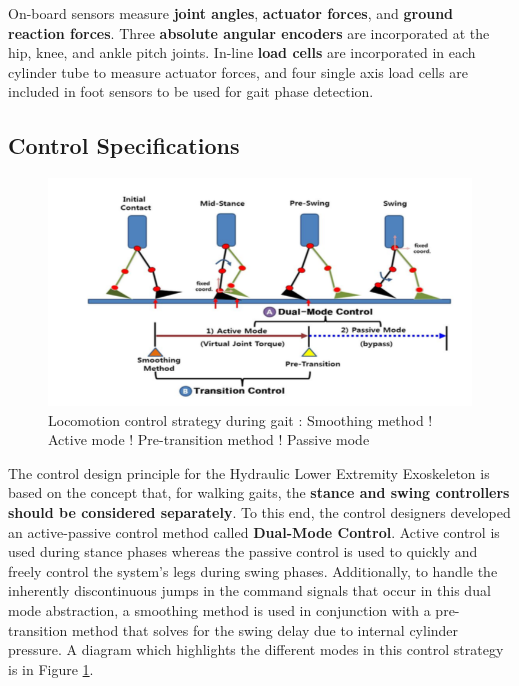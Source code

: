 \begin{refsection}
 On-board sensors measure \textbf{joint angles}, \textbf{actuator forces}, and \textbf{ground reaction forces}.  Three \textbf{absolute angular encoders} are incorporated at the hip, knee, and ankle pitch joints.  In-line \textbf{load cells} are incorporated in each cylinder tube to measure actuator forces, and four single axis load cells are included in foot sensors to be used for gait phase detection.
 
 \subsection{Control Specifications}
 
 \begin{figure}[thpb]
\centering
\includegraphics[width=5.in]{exos/figs/hydLowerExrem/dualModeDia}
  \caption{Locomotion control strategy during gait : Smoothing method ! Active mode ! Pre-transition method ! Passive mode}
 \label{fig:dualModeDia}   
 \end{figure}
The control design principle for the Hydraulic Lower Extremity Exoskeleton is based on the concept that, for walking gaits, the {\bf stance and swing controllers should be considered separately}.  To this end, the control designers developed an active-passive control method called {\bf Dual-Mode Control}.  Active control is used during stance phases whereas the passive control is used to quickly and freely control the system's legs during swing phases.  Additionally, to handle the inherently discontinuous jumps in the command signals that occur in this dual mode abstraction, a smoothing method is used in conjunction with a pre-transition method that solves for the swing delay due to internal cylinder pressure.  A diagram which highlights the different modes in this control strategy is in Figure \ref{fig:dualModeDia}.   


\end{refsection}
